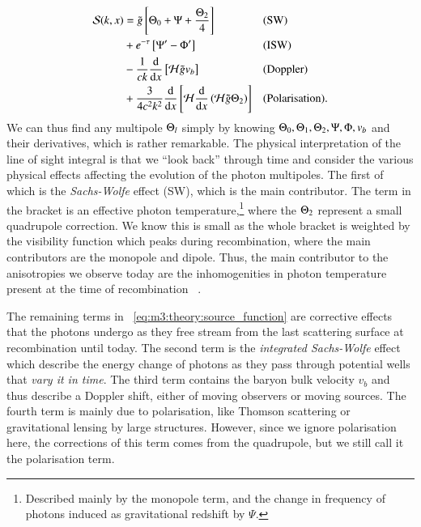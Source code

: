     \begin{equation}\label{eq:m3:theory:source_function}
        \begin{split}
            \mathcal{S}(k,x) &= \tilde{g}\left[\Theta_0+\Psi+\frac{\Theta_2}{4}\right] && \text{(SW)}\\
            &+ e^{-\tau}\left[\Psi'-\Phi'\right] &&\text{(ISW)}\\
            &-\frac{1}{ck}\dv{}{x}\left[\mathcal{H}\tilde{g}v_b\right] && \text{(Doppler)} \\
            &+ \frac{3}{4c^2k^2}\dv{}{x}\left[\mathcal{H}\dv{}{x}\left(\mathcal{H}\tilde{g}\Theta_2\right)\right] && \text{(Polarisation)}.
        \end{split}
    \end{equation}
    We can thus find any multipole $\Theta_l$ simply by knowing $\Theta_0, \Theta_1, \Theta_2, \Psi, \Phi, v_b$ and their derivatives, which is rather remarkable. The physical interpretation of the line of sight integral is that we ``look back'' through time and consider the various physical effects affecting the evolution of the photon multipoles. The first of which is the \textit{Sachs-Wolfe} effect (SW), which is the main contributor. The term in the bracket is an effective photon temperature,\footnote{Described mainly by the monopole term, and the change in frequency of photons induced as gravitational redshift by $\Psi$.} where the $\Theta_2$ represent a small quadrupole correction. We know this is small as the whole bracket is weighted by the visibility function which peaks during recombination, where the main contributors are the monopole and dipole. Thus, the main contributor to the anisotropies we observe today are the inhomogenities in photon temperature present at the time of recombination ~\cite{AST5220LectureNotes}. 

    The remaining terms in ~\cref{eq:m3:theory:source_function} are corrective effects that the photons undergo as they free stream from the last scattering surface at recombination until today. The second term is the \textit{integrated Sachs-Wolfe} effect which describe the energy change of photons as they pass through potential wells that \textit{vary it in time}. The third term contains the baryon bulk velocity $v_b$ and thus describe a Doppler shift, either of moving observers or moving sources. The fourth term is mainly due to polarisation, like Thomson scattering or gravitational lensing by large structures. However, since we ignore polarisation here, the corrections of this term comes from the quadrupole, but we still call it the polarisation term. 



